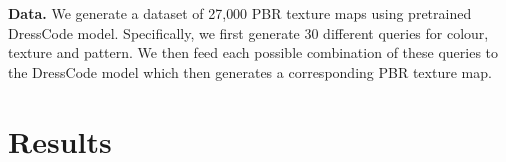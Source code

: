 \documentclass[11pt,twocolumn]{article}
\begin{document}
\textbf{Data.} We generate a dataset of 27{,}000 PBR texture maps using pretrained DressCode \cite{dresscode} model. Specifically,
we first generate 30 different queries for colour, texture and pattern. We then feed each possible combination of these
queries to the DressCode model which then generates a corresponding PBR texture map.








\section{Results}
\end{document}
